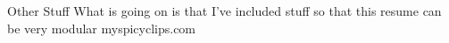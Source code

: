 \begin{category}{Other Stuff}
\citemnobullet What is going on is that I've included stuff so that this resume can be very modular
myspicyclips.com
\end{category}
